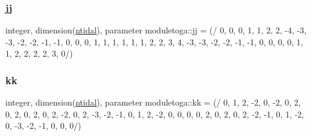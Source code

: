 \mbox{\label{namespacemoduletoga_aa9d388e57890548d613710d426c60d00}} 
\subsubsection{\texorpdfstring{jj}{jj}}
{\footnotesize\ttfamily integer, dimension(\mbox{\hyperlink{namespacemoduletoga_ae4b0b997b6803ae8647fdd97f2dda666}{ntidal}}), parameter moduletoga\+::jj = (/ 0, 0, 0, 1, 1, 2, 2, -\/4, -\/3, -\/3, -\/2, -\/2, -\/1, -\/1, 0, 0, 0, 1, 1, 1, 1, 1, 1, 2, 2, 3, 4, -\/3, -\/3, -\/2, -\/2, -\/1, -\/1, 0, 0, 0, 0, 1, 1, 2, 2, 2, 2, 3, 0/)\hspace{0.3cm}{\ttfamily [private]}}

\mbox{\label{namespacemoduletoga_ad26516df51749ac7f2fd2a972f1a6a26}} 
\subsubsection{\texorpdfstring{kk}{kk}}
{\footnotesize\ttfamily integer, dimension(\mbox{\hyperlink{namespacemoduletoga_ae4b0b997b6803ae8647fdd97f2dda666}{ntidal}}), parameter moduletoga\+::kk = (/ 0, 1, 2, -\/2, 0, -\/2, 0, 2, 0, 2, 0, 2, 0, 2, -\/2, 0, 2, -\/3, -\/2, -\/1, 0, 1, 2, -\/2, 0, 0, 0, 0, 2, 0, 2, 0, 2, -\/2, -\/1, 0, 1, -\/2, 0, -\/3, -\/2, -\/1, 0, 0, 0/)\hspace{0.3cm}{\ttfamily [private]}}

\mbox{\label{namespacemoduletoga_aa6e7e4054f2ee5447ea73ce7fa1c250a}} 
